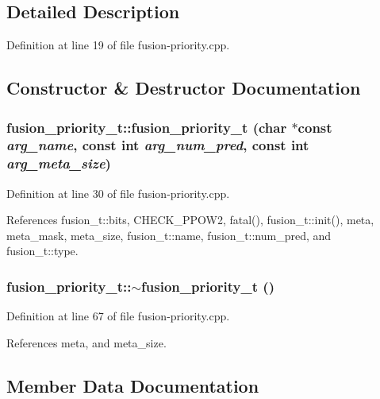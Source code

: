 \subsection{Detailed Description}


Definition at line 19 of file fusion-priority.cpp.

\subsection{Constructor \& Destructor Documentation}
\subsubsection[{fusion\_\-priority\_\-t}]{\setlength{\rightskip}{0pt plus 5cm}fusion\_\-priority\_\-t::fusion\_\-priority\_\-t (char $\ast$const  {\em arg\_\-name}, \/  const int {\em arg\_\-num\_\-pred}, \/  const int {\em arg\_\-meta\_\-size})\hspace{0.3cm}{\tt  [inline]}}\label{classfusion__priority__t_33079f2aba9580affb3815bfd3d10add}




Definition at line 30 of file fusion-priority.cpp.

References fusion\_\-t::bits, CHECK\_\-PPOW2, fatal(), fusion\_\-t::init(), meta, meta\_\-mask, meta\_\-size, fusion\_\-t::name, fusion\_\-t::num\_\-pred, and fusion\_\-t::type.
\subsubsection[{$\sim$fusion\_\-priority\_\-t}]{\setlength{\rightskip}{0pt plus 5cm}fusion\_\-priority\_\-t::$\sim$fusion\_\-priority\_\-t ()\hspace{0.3cm}{\tt  [inline]}}\label{classfusion__priority__t_9e6b8f4508dff82cb5e9b3ab676b94c5}




Definition at line 67 of file fusion-priority.cpp.

References meta, and meta\_\-size.

\subsection{Member Data Documentation}
